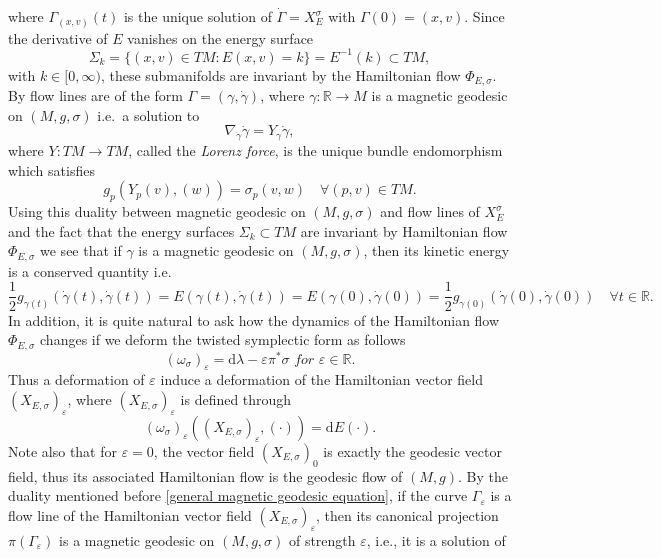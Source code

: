 \documentclass[12pt]{article}
\def\gc{{\gamma}}
\def\dgc{\dot{\gc}}
\newcommand{\R}{\mathbb{R}} %
\newcommand{\dd}{\mathrm{d}}
\begin{document}
where $\Gamma_{(x,v)}(t)$ is the unique solution of $\dot{\Gamma}=X_{E}^{\sigma}$ with $\Gamma(0)=(x,v)$. Since the derivative of $E$ vanishes on the energy surface \[\Sigma_k=\{(x,v)\in TM: E(x,v)=k\}=E^{-1}(k)\subset TM,\] with $k\in[0,\infty)$, these submanifolds are invariant by the Hamiltonian flow $\varPhi_{E, \sigma}$. By \cite{Gin} flow lines are of the form $\Gamma=(\gamma,\dot\gamma)$, where $\gamma:\R\to M$ is a magnetic geodesic on $(M, g, \sigma)$ i.e.\ a solution to \begin{equation}\label{general magnetic geodesic equation}
	\nabla_{\dgc}\dgc= Y_{\gc}\dgc,
\end{equation}
where $Y:TM\longrightarrow TM$, called the \emph{Lorenz force}, is the unique bundle endomorphism which satisfies
\[
g_p\left(Y_p(v), (w)\right)=\sigma_p(v, w) \quad \forall (p,v)\in TM. 
\] 
Using this duality between magnetic geodesic on $(M,g,\sigma)$ and flow lines of $X_{E}^{\sigma}$ and the fact that the energy surfaces $\Sigma_k \subset TM$ are invariant by Hamiltonian flow $\varPhi_{E, \sigma}$ we see that if $\gc$ is a magnetic geodesic on $(M,g,\sigma)$, then its kinetic energy is a conserved quantity i.e. 
\begin{equation}\label{kinetic energy is integral of motion}
	\frac{1}{2}g_{\gc(t)}(\dgc(t), \dgc(t))=E(\gc(t),\dgc(t))= E(\gc(0), \dgc(0))=\frac{1}{2}g_{\gc(0)}(\dgc(0), \dgc(0))\quad \forall t\in \R.
\end{equation}
In addition, it is quite natural to ask how the dynamics of the Hamiltonian flow $\varPhi_{E, \sigma}$ changes if we deform the twisted symplectic form as follows \begin{equation*}
    \left(\omega_{\sigma}\right)_{\varepsilon}=\dd \lambda-\varepsilon\pi^*\sigma \textit{ for }\varepsilon\in\R.
\end{equation*}
Thus a deformation of $\varepsilon$ induce a deformation of the Hamiltonian vector field $\left(X_{E,\sigma}\right)_{\varepsilon}$, where $\left(X_{E,\sigma}\right)_{\varepsilon}$ is defined through\begin{equation*}
    \left(\omega_{\sigma}\right)_{\varepsilon}\left( \left(X_{E,\sigma}\right)_{\varepsilon}, (\cdot)\right)=\dd E(\cdot).
\end{equation*} Note also that for $\varepsilon=0$, the vector field $\left(X_{E,\sigma}\right)_0$ is exactly the geodesic vector field, thus its associated Hamiltonian flow is the geodesic flow of $(M,g)$. By the duality mentioned before \eqref{general magnetic geodesic equation}, if the curve $\Gamma_{\varepsilon}$ is a flow line of the Hamiltonian vector field $\left(X_{E,\sigma}\right)_{\varepsilon}$, then its canonical projection $\pi\left(\Gamma_{\varepsilon}\right)$ is a magnetic geodesic on $(M,g,\sigma)$ of strength $\varepsilon$, i.e., it is a solution of 
\end{document}
